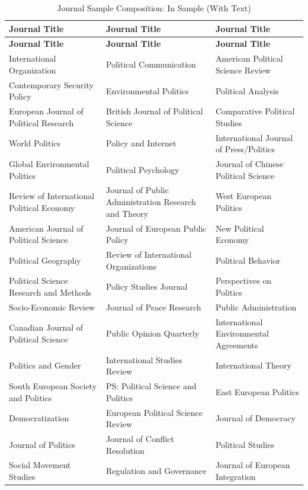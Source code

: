 \documentclass[12pt]{article}
\begin{document}
\begin{longtable}{p{}p{}p{}}
\caption{Journal Sample Composition: In Sample (With Text)}
\label{tab:insample_text} \\
\hline
\textbf{Journal Title} & \textbf{Journal Title} & \textbf{Journal Title} \\
\hline
\endfirsthead
\hline
\textbf{Journal Title} & \textbf{Journal Title} & \textbf{Journal Title} \\
\hline
\endhead
International Organization & Political Communication & American Political Science Review \\
Contemporary Security Policy & Environmental Politics & Political Analysis \\
European Journal of Political Research & British Journal of Political Science & Comparative Political Studies \\
World Politics & Policy and Internet & International Journal of Press/Politics \\
Global Environmental Politics & Political Psychology & Journal of Chinese Political Science \\
Review of International Political Economy & Journal of Public Administration Research and Theory & West European Politics \\
American Journal of Political Science & Journal of European Public Policy & New Political Economy \\
Political Geography & Review of International Organizations & Political Behavior \\
Political Science Research and Methods & Policy Studies Journal & Perspectives on Politics \\
Socio-Economic Review & Journal of Peace Research & Public Administration \\
Canadian Journal of Political Science & Public Opinion Quarterly & International Environmental Agreements \\
Politics and Gender & International Studies Review & International Theory \\
South European Society and Politics & PS: Political Science and Politics & East European Politics \\
Democratization & European Political Science Review & Journal of Democracy \\
Journal of Politics & Journal of Conflict Resolution & Political Studies \\
Social Movement Studies & Regulation and Governance & Journal of European Integration \\

\end{longtable}
\end{document}
